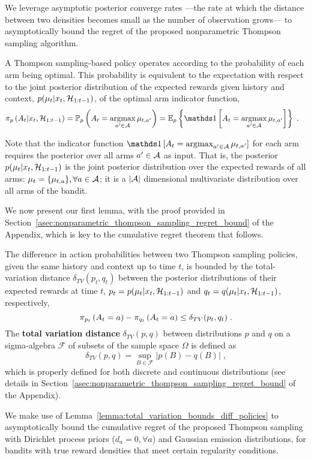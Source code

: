 We leverage asymptotic posterior converge rates ---the rate at which the distance between two densities becomes small as the number of observation grows--- to asymptotically bound the regret of the proposed nonparametric Thompson sampling algorithm.

A Thompson sampling-based policy operates according to the probability of each arm being optimal. This probability is equivalent to the expectation with respect to the joint posterior distribution of the expected rewards given history and context, $p(\mu_t|x_{t},\mathcal{H}_{1:t-1})$, of the optimal arm indicator function, \ie
\begin{align}
\myPi{p}{A_t|x_{t},\HH_{1:t-1}} &= \myProb{p}{A_t=\argmax_{a^\prime \in \A} \mu_{t,a^\prime}} =\eValue{p}{\myind{A_t=\argmax_{a^\prime \in \A}\mu_{t,a^\prime}}} \;.
\nonumber
\end{align}

Note that the indicator function $\myind{A_t=\argmax_{a^\prime \in \A}\mu_{t,a^\prime}}$ for each arm requires the posterior over all arms $a^\prime \in \mathcal{A}$ as input. That is, the posterior $p(\mu_t|x_{t},\mathcal{H}_{1:t-1})$ is the joint posterior distribution over the expected rewards of all arms: $\mu_{t}=\{\mu_{t,a}\}, \forall a\in \mathcal{A}$; \ie it is a $|\mathcal{A}|$ dimensional multivariate distribution over all arms of the bandit.

We now present our first lemma, with the proof provided in Section~\ref{asec:nonparametric_thompson_sampling_regret_bound} of the Appendix, which is key to the cumulative regret theorem that follows.
\begin{lemma}
	The difference in action probabilities between two Thompson sampling policies, given the same history and context up to time $t$, is bounded by the total-variation distance $\delta_{TV}(p_t,q_t)$ between the posterior distributions of their expected rewards at time $t$, $p_t=p(\mu_{t}|x_t,\mathcal{H}_{1:t-1})$ and $q_t=q(\mu_{t}|x_t,\mathcal{H}_{1:t-1})$, respectively,
	\begin{equation}
	\pi_{p_t}\left( A_t=a \right) - \pi_{q_t}\left( A_t=a \right) \leq \delta_{TV}(p_t,q_t) \; .
	\nonumber
	\end{equation}
	\label{lemma:total_variation_bounds_diff_policies}
	The \textbf{total variation distance} $\delta_{TV}(p,q)$ between distributions $p$ and $q$ on a sigma-algebra $\mathcal{F}$ of subsets of the sample space $\Omega$ is defined as
	\begin{equation}
	\delta_{TV}(p, q) = \sup_{B \in \mathcal{F}} \left|p(B)-q(B)\right| \; ,
	\end{equation}
	which is properly defined for both discrete and continuous distributions (see details in Section~\ref{asec:nonparametric_thompson_sampling_regret_bound} of the Appendix).
\end{lemma}
We make use of Lemma~\ref{lemma:total_variation_bounds_diff_policies} to asymptotically bound the cumulative regret of the proposed Thompson sampling with Dirichlet process priors (\ie $d_a=0, \forall a$) and Gaussian emission distributions, for bandits with true reward densities that meet certain regularity conditions. 

